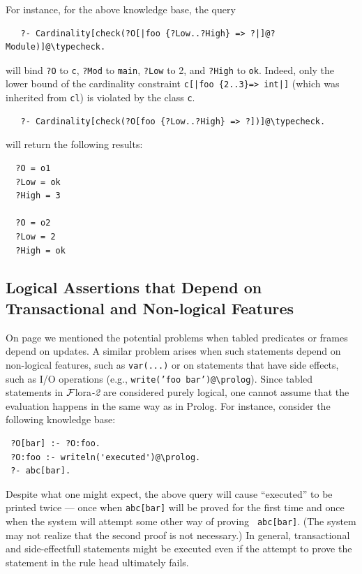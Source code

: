 \documentclass[11pt]{article}
\newcommand{\FLORA}{{\mbox{\sc ${\cal F}${lora}\rm\emph{-2}}}\xspace}
\newcommand{\FLSYSTEM}{\FLORA}
\newcommand{\bs}{\textbackslash}
\begin{document}
\begin{itemize}
  For instance, for the above knowledge base, the query
\begin{verbatim}
   ?- Cardinality[check(?O[|foo {?Low..?High} => ?|]@?Module)]@\typecheck.  
\end{verbatim}
  will bind {\tt ?O} to {\tt c}, {\tt ?Mod} to {\tt main}, {\tt ?Low} to 2,
  and {\tt ?High} to {\tt ok}. Indeed, only the lower bound of the
  cardinality constraint {\tt c[|foo \{2..3\}=> int|]} (which was inherited from
  {\tt cl}) is violated by the class {\tt c}.
\begin{verbatim}
   ?- Cardinality[check(?O[foo {?Low..?High} => ?])]@\typecheck.
\end{verbatim}
  will return the following results:
\begin{verbatim}
  ?O = o1
  ?Low = ok
  ?High = 3

  ?O = o2
  ?Low = 2
  ?High = ok
\end{verbatim}

\end{itemize}



\subsection{Logical Assertions that Depend on Transactional and Non-logical Features}

On page \pageref{page-depchk} we mentioned the potential problems when
tabled predicates or frames depend on updates. A similar problem
arises when such statements depend on non-logical features, such as
{\tt var(...)} or on statements that have side effects, such as I/O
operations (e.g., {\tt write('foo bar')@\bs{}prolog}). Since tabled statements
in \FLSYSTEM are considered purely logical, one cannot assume that the
evaluation happens in the same way as in Prolog.
For instance, consider the following knowledge base:
\begin{verbatim}
 ?O[bar] :- ?O:foo.
 ?O:foo :- writeln('executed')@\prolog.  
 ?- abc[bar].
\end{verbatim}
Despite what one might expect, the above query will cause ``executed'' to
be printed twice --- once when {\tt abc[bar]} will be proved for the first
time and once when the system will attempt some other way of proving {\tt
  abc[bar]}. (The system may not realize that the second proof is not
necessary.) In general, transactional and side-effectfull statements 
might be executed even if the attempt to prove the statement in the rule
head ultimately fails.
\end{document}
